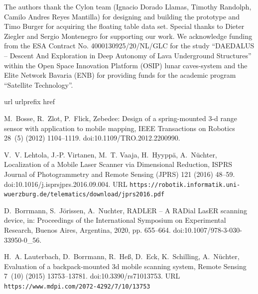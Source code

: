 \documentclass[5p]{elsarticle}
\begin{document}
The authors thank the Cylon team (Ignacio Dorado Llamas, Timothy Randolph, Camilo Andres Reyes Mantilla) for designing and building the prototype and Timo Burger for acquiring the floating table data set.
Special thanks to Dieter Ziegler and Sergio Montenegro for supporting our work.
We acknowledge funding from the ESA Contract No. 4000130925/20/NL/GLC for the study ``DAEDALUS -- Descent And Exploration in Deep Autonomy of Lava Underground Structures'' within the Open Space Innovation Platform (OSIP) lunar caves-system and the Elite Network Bavaria (ENB) for providing funds for the academic program ``Satellite Technology''.


\begin{thebibliography}{10}
\expandafter\ifx\csname url\endcsname\relax
  \def\url#1{\texttt{#1}}\fi
\expandafter\ifx\csname urlprefix\endcsname\relax\def\urlprefix{URL }\fi
\expandafter\ifx\csname href\endcsname\relax
  \def\href#1#2{#2} \def\path#1{#1}\fi

M.~Bosse, R.~Zlot, P.~Flick, Zebedee: Design of a spring-mounted 3-d range
  sensor with application to mobile mapping, IEEE Transactions on Robotics
  28~(5) (2012) 1104--1119.
\newblock \href {http://dx.doi.org/10.1109/TRO.2012.2200990}
  {\path{doi:10.1109/TRO.2012.2200990}}.

V.~V. Lehtola, J.-P. Virtanen, M.~T. Vaaja, H.~Hyypp{\"a}, A.~N{\"u}chter,
  \href{https://robotik.informatik.uni-wuerzburg.de/telematics/download/jprs2016.pdf}{{Localization
  of a Mobile Laser Scanner via Dimensional Reduction}}, ISPRS Journal of
  Photogrammetry and Remote Sensing (JPRS) 121 (2016) 48--59.
\newblock \href {http://dx.doi.org/10.1016/j.isprsjprs.2016.09.004}
  {\path{doi:10.1016/j.isprsjprs.2016.09.004}}.
\newline\urlprefix\url{https://robotik.informatik.uni-wuerzburg.de/telematics/download/jprs2016.pdf}

D.~Borrmann, S.~Jörissen, A.~Nuchter, {RADLER -- A RADial LasER scanning
  device}, in: {Proceedings of the International Symposium on Experimental
  Research}, {Buenos Aires, Argentina}, 2020, pp. 655--664.
\newblock \href {http://dx.doi.org/10.1007/978-3-030-33950-0_56}
  {\path{doi:10.1007/978-3-030-33950-0_56}}.

H.~A. Lauterbach, D.~Borrmann, R.~Heß, D.~Eck, K.~Schilling, A.~Nüchter,
  \href{https://www.mdpi.com/2072-4292/7/10/13753}{Evaluation of a
  backpack-mounted 3d mobile scanning system}, Remote Sensing 7~(10) (2015)
  13753--13781.
\newblock \href {http://dx.doi.org/10.3390/rs71013753}
  {\path{doi:10.3390/rs71013753}}.
\newline\urlprefix\url{https://www.mdpi.com/2072-4292/7/10/13753}


\end{thebibliography}
\end{document}
